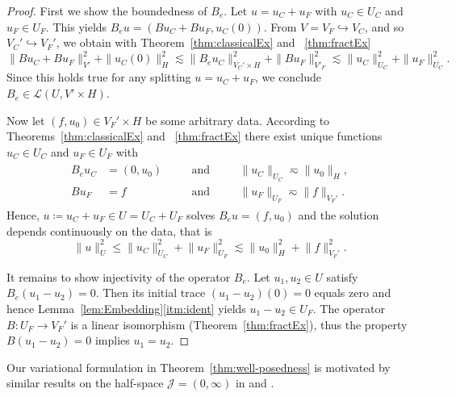 \documentclass{amsart}
\newcommand{\cJ}{\mathcal J}
\newcommand{\cL}{\mathcal L}
\begin{document}
\begin{proof} 
First we show the boundedness of $B_e$.
Let $u=u_C+u_F$ with $u_C \in U_C$ and $u_F \in U_F$. This yields $B_e u=(B u_C+B u_F, u_C(0))$. From $V=V_F \hookrightarrow V_C$, and so 
$V_C' \hookrightarrow V_F'$, we obtain with Theorem~\ref{thm:classicalEx} and ~\ref{thm:fractEx}
\begin{equation*}
\|B u_C+B u_F\|_{V'}^2+\|u_C(0)\|_H^2 \lesssim \|B_e u_C\|_{V_C'\times H}^2+\|B u_F\|_{V'_F}^2 \lesssim \|u_C\|_{U_C}^2+\|u_F\|_{U_C}^2.
\end{equation*}
Since this holds true for any splitting $u=u_C+u_F$, we conclude $B_e \in \cL(U ,V ' \times H)$.

Now let $(f,u_0) \in V_F' \times H$ be some arbitrary data. According to Theorems~\ref{thm:classicalEx} and ~\ref{thm:fractEx} there exist unique functions $u_C \in U_C$ and $u_F \in U_F$ with 
\begin{align*}
\begin{aligned}
B_e u_C &= (0,u_0) &&\quad \text{and}&&\quad \lVert u_C \rVert_{U_C} \eqsim \lVert u_0 \rVert_{H},\\
B u_F &= f && \quad\text{and}&&\quad \lVert u_F \rVert_{U_F} \eqsim \lVert f\rVert_{V_F'}.
\end{aligned}
\end{align*} 
Hence, $u \coloneqq u_C + u_F \in U = U_C + U_F$ solves $B_e u = (f,u_0)$ and the solution depends continuously on the data, that is
\begin{equation*}
\lVert u \rVert_U^2 \leq \lVert u_C \rVert^2_{U_C} + \lVert u_F \rVert^2_{U_F} \lesssim \lVert u_0 \rVert^2_H + \lVert f\rVert_{V_F'}^2.
\end{equation*}

It remains to show injectivity of the operator $B_e$. Let $u_1,u_2\in U$ satisfy $B_e (u_1-u_2) = 0$. Then its initial trace $(u_1-u_2)(0) = 0$ equals zero and hence Lemma~\ref{lem:Embedding}\ref{itm:ident} yields $u_1-u_2 \in U_F$. The operator $B\colon U_F \to V_F'$ is a linear isomorphism (Theorem~\ref{thm:fractEx}), thus the property $B(u_1-u_2) = 0$ implies $u_1 = u_2$. 
\end{proof}
\begin{remark}
Our variational formulation in Theorem~\ref{thm:well-posedness} is motivated by similar results on the half-space $\cJ = (0,\infty)$ in \cite[Thm.~2]{Tomarelli83} and \cite[Thm.~4.5]{Fontes09}.
\end{remark}
\end{document}
